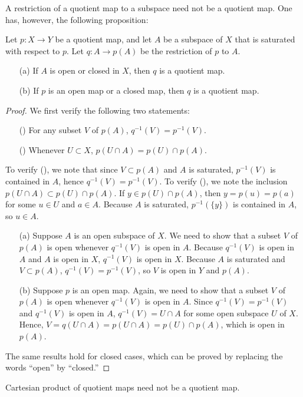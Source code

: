 A restriction of a quotient map to a subspace need not be a quotient map.
One has, however, the following proposition:
\begin{prop}
    Let $p: X\rightarrow Y$ be a quotient map, and let $A$ be a subspace of $X$ that is saturated with respect to $p$.
    Let $q: A\rightarrow p(A)$ be the restriction of $p$ to $A$.
    \begin{enumerate}
        \item[(a)]
        {
            If $A$ is open or closed in $X$, then $q$ is a quotient map.
        }
        \item[(b)]
        {
            If $p$ is an open map or a closed map, then $q$ is a quotient map.
        }
    \end{enumerate}
\end{prop}
\begin{proof}
    We first verify the following two statements:
    \begin{enumerate}
        \item[(\romannumeral 1)]
        {
            For any subset $V$ of $p(A)$, $q^{-1}(V)=p^{-1}(V)$.
        }
        \item[(\romannumeral 2)]
        {
            Whenever $U\subset X$, $p(U\cap A)=p(U)\cap p(A)$.
        }
    \end{enumerate}
    To verify (), we note that since $V\subset p(A)$ and $A$ is saturated, $p^{-1}(V)$ is contained in $A$, hence $q^{-1}(V)=p^{-1}(V)$.
    To verify (), we note the inclusion $p(U\cap A)\subset p(U)\cap p(A)$.
    If $y\in p(U)\cap p(A)$, then $y=p(u)=p(a)$ for some $u\in U$ and $a\in A$.
    Because $A$ is saturated, $p^{-1}(\{y\})$ is contained in $A$, so $u\in A$.
    \begin{enumerate}
        \item[(a)]
        {
            Suppose $A$ is an open subspace of $X$.
            We need to show that a subset $V$ of $p(A)$ is open whenever $q^{-1}(V)$ is open in $A$.
            Because $q^{-1}(V)$ is open in $A$ and $A$ is open in $X$, $q^{-1}(V)$ is open in $X$.
            Because $A$ is saturated and $V\subset p(A)$, $q^{-1}(V)=p^{-1}(V)$, so $V$ is open in $Y$ and $p(A)$.
        }
        \item[(b)]
        {
            Suppose $p$ is an open map.
            Again, we need to show that a subset $V$ of $p(A)$ is open whenever $q^{-1}(V)$ is open in $A$.
            Since $q^{-1}(V)=p^{-1}(V)$ and $q^{-1}(V)$ is open in $A$, $q^{-1}(V)=U\cap A$ for some open subspace $U$ of $X$.
            Hence, $V=q(U\cap A)=p(U\cap A)=p(U)\cap p(A)$, which is open in $p(A)$.
        }
    \end{enumerate}
    The same results hold for closed cases, which can be proved by replacing the words ``open'' by ``closed.''
\end{proof}
\begin{rmk}
    Cartesian product of quotient maps need not be a quotient map.
\end{rmk}

